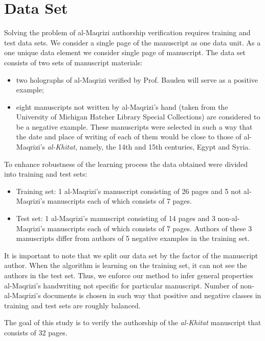 \documentclass[conference,a4paper,twocolumn]{IEEEtran}
\begin{document}
\section{Data Set}
\label{sec:the_data}

Solving the problem of al-Maqrizi authorship verification requires training and test data sets. 
We consider a single page of the manuscript as one data unit.
As a one unique data element we consider single page of manuscript. The data set consists of two sets of manuscript materials:
\begin{itemize}
	\item two holographs of al-Maqrizi verified by Prof. Bauden will serve as a positive example;
	\item eight manuscripts not written by al-Maqrizi's hand  (taken from the University of Michigan Hatcher Library Special Collections) are considered to be a negative example. These manuscripts were selected in such a way that the date and place of writing of each of them would be close to those of al-Maqrizi's  \textit{al-Khitat}, namely, the 14th and 15th centuries, Egypt and Syria.
\end{itemize}

To enhance robustness of the learning process the data obtained were divided into training and test sets:
\begin{itemize}
	\item Training set: 1 al-Maqrizi's manuscript consisting of 26 pages and 5 not al-Maqrizi's manuscripts each of which consists of 7 pages.
	\item Test set: 1 al-Maqrizi's manuscript consisting of 14 pages and 3 non-al-Maqrizi's manuscripts each of which consists of 7 pages. Authors of these 3 manuscripts differ from authors of 5 negative examples in the training set.   
\end{itemize}

It is important to note that we split our data set by the factor of the manuscript author. When the algorithm is learning on the training set, it can not see the authors in the test set. Thus, we enforce our method to infer general properties al-Maqrizi's handwriting not specific for particular manuscript. Number of non-al-Maqrizi's documents is chosen in such way that positive and negative classes in training and test sets are roughly balanced.

The goal of this study is to verify the authorship of the \textit{al-Khitat} manuscript that consists of 32 pages.
\end{document}
